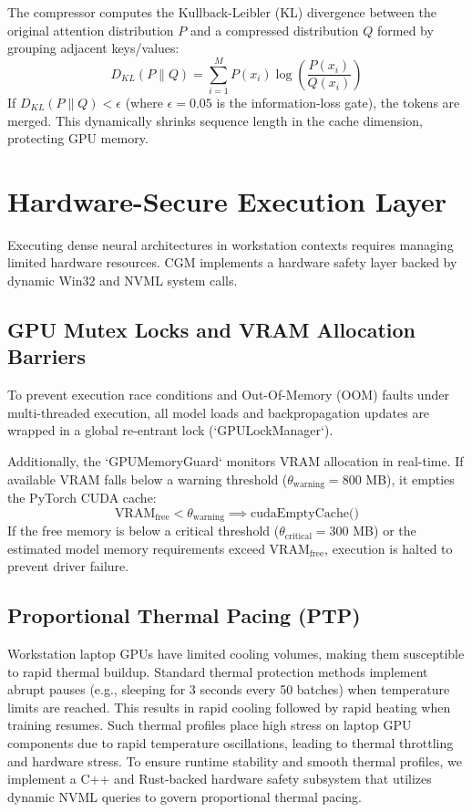 \documentclass[conference]{IEEEtran}
\begin{document}
The compressor computes the Kullback-Leibler (KL) divergence between the original attention distribution $P$ and a compressed distribution $Q$ formed by grouping adjacent keys/values:
\begin{equation}
D_{KL}(P \parallel Q) = \sum_{i=1}^{M} P(x_i) \log \left( \frac{P(x_i)}{Q(x_i)} \right)
\end{equation}
If $D_{KL}(P \parallel Q) < \epsilon$ (where $\epsilon = 0.05$ is the information-loss gate), the tokens are merged. This dynamically shrinks sequence length in the cache dimension, protecting GPU memory.

\section{Hardware-Secure Execution Layer}
Executing dense neural architectures in workstation contexts requires managing limited hardware resources. CGM implements a hardware safety layer backed by dynamic Win32 and NVML system calls.

\subsection{GPU Mutex Locks and VRAM Allocation Barriers}
To prevent execution race conditions and Out-Of-Memory (OOM) faults under multi-threaded execution, all model loads and backpropagation updates are wrapped in a global re-entrant lock (`GPULockManager`). 

Additionally, the `GPUMemoryGuard` monitors VRAM allocation in real-time. If available VRAM falls below a warning threshold ($\theta_{\text{warning}} = 800$ MB), it empties the PyTorch CUDA cache:
\begin{equation}
\text{VRAM}_{\text{free}} < \theta_{\text{warning}} \implies \text{cudaEmptyCache()}
\end{equation}
If the free memory is below a critical threshold ($\theta_{\text{critical}} = 300$ MB) or the estimated model memory requirements exceed $\text{VRAM}_{\text{free}}$, execution is halted to prevent driver failure.

\subsection{Proportional Thermal Pacing (PTP)}
Workstation laptop GPUs have limited cooling volumes, making them susceptible to rapid thermal buildup. Standard thermal protection methods implement abrupt pauses (e.g., sleeping for 3 seconds every 50 batches) when temperature limits are reached. This results in rapid cooling followed by rapid heating when training resumes. Such thermal profiles place high stress on laptop GPU components due to rapid temperature oscillations, leading to thermal throttling and hardware stress. To ensure runtime stability and smooth thermal profiles, we implement a C++ and Rust-backed hardware safety subsystem that utilizes dynamic NVML queries to govern proportional thermal pacing. 
\end{document}
